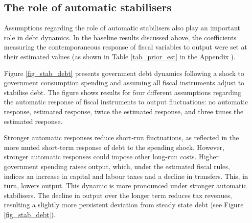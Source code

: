 \documentclass[a4paper,11pt]{article}
\numberwithin{equation}{section}
\begin{document}
	\subsection{The role of automatic stabilisers}
	
	Assumptions regarding the role of automatic stabilisers also play an important role in debt dynamics. In the baseline results discussed above, the coefficients measuring the contemporaneous response of fiscal variables to output were set at their estimated values (as shown in Table \ref{tab_prior_est} in the Appendix ). 

	Figure \ref{fig_stab_debt} presents government debt dynamics following a shock to government consumption spending and assuming all fiscal instruments adjust to stabilise debt. The figure shows results for four different assumptions regarding the automatic response of fiscal instruments to output fluctuations: no automatic response, estimated response, twice the estimated response, and three times the estimated response.
	
	Stronger automatic responses reduce short-run fluctuations, as reflected in the more muted short-term response of debt to the spending shock. However, stronger automatic responses could impose other long-run costs. Higher government spending raises output, which, under the estimated fiscal rules, indices an increase in capital and labour taxes and a decline in transfers. This, in turn, lowers output. This dynamic is more pronounced under stronger automatic stabilisers. The decline in output over the longer term reduces tax revenues, resulting a slightly more persistent deviation from steady state debt (see Figure \ref{fig_stab_debt}).   
	
	\begin{minipage}{\linewidth}
		
	\end{minipage}
	
\end{document}
